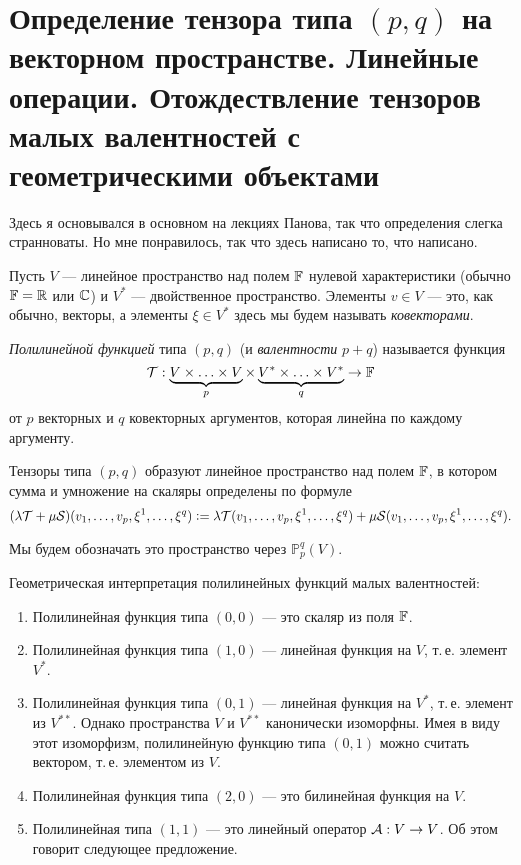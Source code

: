 \section{Определение тензора типа $(p, q)$ на векторном пространстве. Линейные операции. Отождествление тензоров малых валентностей с геометрическими объектами}

Здесь я основывался в основном на лекциях Панова, так что определения слегка странноваты. Но мне понравилось, так что здесь написано то, что написано.

Пусть $V$ --- линейное пространство над полем $\mathbb{F}$ нулевой характеристики (обычно $\mathbb{F} = \mathbb{R}$ или $\mathbb{C}$) и $V^\ast$ --- двойственное пространство. Элементы $v \in V$ --- это, как обычно, векторы, а элементы $\xi \in V^\ast$ здесь мы будем называть \textit{ковекторами}.

\begin{definition}
    \textit{Полилинейной функцией} типа $(p, q)$ (и \textit{валентности} $p + q$) называется функция
    \[
        \mathcal{T}: \underbrace{V \times \ldots \times V}_p \times \underbrace{V^\ast \times \ldots \times V^\ast}_q \to \mathbb{F}
    \]
    от $p$ векторных и $q$ ковекторных аргументов, которая линейна по каждому аргументу.
\end{definition}

Тензоры типа $(p, q)$ образуют линейное пространство над полем $\mathbb{F}$, в котором сумма и умножение на скаляры определены по формуле
\[
    (\lambda\mathcal{T} + \mu\mathcal{S})(v_1, \ldots, v_p, \xi^1, \ldots, \xi^q) \vcentcolon = \lambda\mathcal{T}(v_1, \ldots, v_p, \xi^1, \ldots, \xi^q) + \mu\mathcal{S}(v_1, \ldots, v_p, \xi^1, \ldots, \xi^q).
\]

Мы будем обозначать это пространство через $\mathbb{P}_p^q(V)$.

\begin{example}
    Геометрическая интерпретация полилинейных функций малых валентностей:
    \begin{enumerate}
        \item Полилинейная функция типа $(0, 0)$ --- это скаляр из поля $\mathbb{F}$.
        \item Полилинейная функция типа $(1, 0)$ --- линейная функция на $V$, т.\,е. элемент $V^\ast$.
        \item Полилинейная функция типа $(0, 1)$ --- линейная функция на $V^\ast$, т.\,е. элемент из $V^{\ast\ast}$. Однако пространства $V$ и $V^{\ast\ast}$ канонически изоморфны. Имея в виду этот изоморфизм, полилинейную функцию типа $(0, 1)$ можно считать вектором, т.\,е. элементом из $V$.
        \item Полилинейная функция типа $(2, 0)$ --- это билинейная функция на $V$.
        \item Полилинейная типа $(1, 1)$ --- это линейный оператор $\mathcal{A}: V \to V$. Об этом говорит следующее предложение.
    \end{enumerate}
\end{example}

